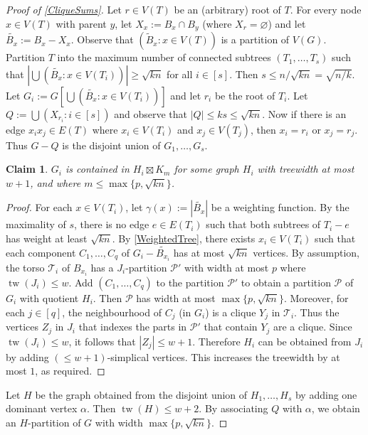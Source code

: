 \documentclass[12pt]{article}
\renewcommand{\emptyset}{\varnothing}
\renewcommand{\geq}{\geqslant}
\renewcommand{\leq}{\leqslant}
\DeclareMathOperator{\tw}{tw}
\newcommand{\PP}{\mathcal{P}}
\theoremstyle{plain}
\newtheorem*{claim}{Claim}
\theoremstyle{definition}
\begin{document}
\begin{proof}[Proof of \cref{CliqueSums}]
    Let $r\in V(T)$ be an (arbitrary) root of $T$. For every node $x\in V(T)$ with parent $y$, let $X_x:=B_x\cap B_y$ (where $X_r=\emptyset$) and let $\tilde{B_x}:=B_x-X_x$. Observe that $(\tilde{B}_x \colon x \in V(T))$ is a partition of $V(G)$. Partition $T$ into the maximum number of connected subtrees $(T_1,\dots,T_s)$ such that $|\bigcup (\tilde{B_x}: x \in V(T_i))|\geq \sqrt{kn}$ for all $i \in [s]$. Then $s\leq n/\sqrt{kn}=\sqrt{n/k}$. Let $G_i:=G[\bigcup(\tilde{B_x}: x \in V(T_i))]$ and let $r_i$ be the root of $T_i$.  Let $Q:= \bigcup (X_{r_i}:i\in [s])$ and observe that $|Q|\leq ks\leq \sqrt{kn}$. Now if there is an edge $x_ix_j\in E(T)$ where $x_i\in V(T_i)$ and $x_j\in V(T_j)$, then $x_i=r_i$ or $x_j=r_j$. Thus $G-Q$ is the disjoint union of $G_1,\dots,G_s$.
    
    \begin{claim}
        $G_i$ is contained in $H_i\boxtimes K_m$ for some graph $H_i$ with treewidth at most $w+1$, and where $m\leq\max\{p,\sqrt{kn}\}$.
    \end{claim}
    \begin{proof}
        For each $x\in V(T_i)$, let $\gamma(x):=|\tilde{B_{x}}|$ be a weighting function.
        By the maximality of $s$, there is no edge $e\in E(T_i)$ such that both subtrees of $T_i-e$ has weight at least $\sqrt{kn}$. By \cref{WeightedTree}, there exists $x_i\in V(T_i)$ such that each component $C_1,\dots,C_q$ of $G_i-\tilde{B_{x_i}}$ has at most $\sqrt{kn}$ vertices.
        By assumption, the torso $\mathcal{T}_i$ of $B_{x_i}$ has a $J_i$-partition $\PP'$ with width at most $p$ where $\tw(J_i)\leq w$. Add $(C_1,\dots, C_q)$ to the partition $\PP'$ to obtain a partition $\PP$ of $G_i$ with quotient $H_i$. Then $\PP$ has width at most $\max\{p,\sqrt{kn}\}$. Moreover, for each $j\in [q]$, the neighbourhood of $C_j$ (in $G_i$) is a clique $Y_j$ in $\mathcal{T}_i$. Thus the vertices $Z_j$ in $J_i$ that indexes the parts in $\PP'$ that contain $Y_j$ are a clique. Since $\tw(J_i)\leq w$, it follows that $|Z_j|\leq w+1$. Therefore $H_i$ can be obtained from $J_i$ by adding $(\leq w+1)$-simplical vertices. This increases the treewidth by at most $1$, as required.
    \end{proof}

    Let $H$ be the graph obtained from the disjoint union of $H_1,\dots, H_s$ by adding one dominant vertex $\alpha$. Then $\tw(H)\leq w+2$. By associating $Q$ with $\alpha$, we obtain an $H$-partition of $G$ with width $\max\{p,\sqrt{kn}\}$.
\end{proof}
\end{document}
